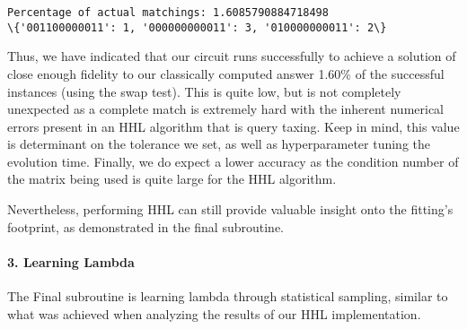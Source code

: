 \documentclass[11pt]{article}
\begin{document}
    \begin{Verbatim}[commandchars=\\\{\}]
Percentage of actual matchings: 1.6085790884718498
\{'001100000011': 1, '000000000011': 3, '010000000011': 2\}
    \end{Verbatim}

    Thus, we have indicated that our circuit runs successfully to achieve a
solution of close enough fidelity to our classically computed answer
1.60\% of the successful instances (using the swap test). This is quite
low, but is not completely unexpected as a complete match is extremely
hard with the inherent numerical errors present in an HHL algorithm that
is query taxing. Keep in mind, this value is determinant on the
tolerance we set, as well as hyperparameter tuning the evolution time.
Finally, we do expect a lower accuracy as the condition number of the
matrix being used is quite large for the HHL algorithm.

Nevertheless, performing HHL can still provide valuable insight onto the
fitting's footprint, as demonstrated in the final subroutine.

    \paragraph{\texorpdfstring{\textbf{3. Learning
Lambda}}{3. Learning Lambda}}\label{learning-lambda}

The Final subroutine is learning lambda through statistical sampling,
similar to what was achieved when analyzing the results of our HHL
implementation.
\end{document}
